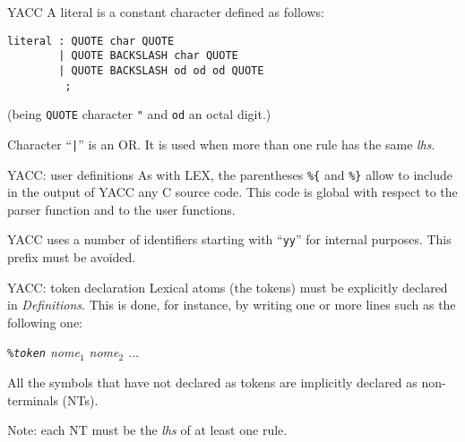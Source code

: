 \begin{frame}[fragile]{YACC}
A literal is a constant character defined as follows:


\vspace{20pt}

\begin{verbatim}
literal : QUOTE char QUOTE 
        | QUOTE BACKSLASH char QUOTE
        | QUOTE BACKSLASH od od od QUOTE
         ;
\end{verbatim}


\vspace{20pt}

\noindent
(being {\tt QUOTE} character \verb'"' and {\tt od} an octal digit.)


\vspace{20pt}

Character ``\verb"|"'' is an OR. It is used when more than one rule
has the same  {\em lhs}.


\end{frame}
\begin{frame}[fragile]{YACC: user definitions}
As with LEX, the parentheses
 \verb"%{" and \verb"%}" allow to include in the output of YACC
 any C source code. This code is global with respect to the
 parser function and to the user functions.


\vspace{20pt}

YACC uses a number of identifiers starting with
``{\tt yy}'' for internal purposes. This prefix must be avoided.


\end{frame}
\begin{frame}[fragile]{YACC: token declaration}
Lexical atoms (the tokens) must be explicitly declared in 
{\em Definitions}. This is done, for instance,
by writing one or more lines
such as the following one:


\vspace{20pt}

\begin{center}\em
\verb"%token" nome${}_1$  nome${}_2$  $\dots$
\end{center}


\vspace{20pt}

All the symbols that have not declared as tokens are
implicitly declared as non-terminals (NTs). 

\vspace{20pt}


Note: each NT must be the {\em lhs\/} of at least one rule.


\end{frame}
